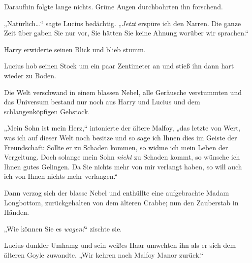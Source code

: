 Daraufhin folgte lange nichts. Grüne Augen durchbohrten ihn forschend.

„Natürlich…“ sagte Lucius bedächtig. „\emph{Jetzt} erspüre ich den Narren. Die ganze Zeit über gaben Sie nur vor, Sie hätten Sie keine Ahnung worüber wir sprachen.“

Harry erwiderte seinen Blick und blieb stumm.

Lucius hob seinen Stock um ein paar Zentimeter an und stieß ihn dann hart wieder zu Boden.

Die Welt verschwand in einem blassen Nebel, alle Geräusche verstummten und das Universum bestand nur noch aus Harry und Lucius und dem schlangenköpfigen Gehstock.

„Mein Sohn ist mein Herz,“ intonierte der ältere Malfoy, „das letzte von Wert, was ich auf dieser Welt noch besitze und so sage ich Ihnen dies im Geiste der Freundschaft: Sollte er zu Schaden kommen, so widme ich mein Leben der Vergeltung. Doch solange mein Sohn \emph{nicht} zu Schaden kommt, so wünsche ich Ihnen gutes Gelingen. Da Sie nichts mehr von mir verlangt haben, so will auch ich von Ihnen nichts mehr verlangen.“

Dann verzog sich der blasse Nebel und enthüllte eine aufgebrachte Madam Longbottom, zurückgehalten von dem älteren Crabbe; nun den Zauberstab in Händen.

„Wie können Sie es \emph{wagen!}“ zischte sie.

Lucius dunkler Umhamg und sein weißes Haar umwehten ihn als er sich dem älteren Goyle zuwandte. „Wir kehren nach Malfoy Manor zurück.“

